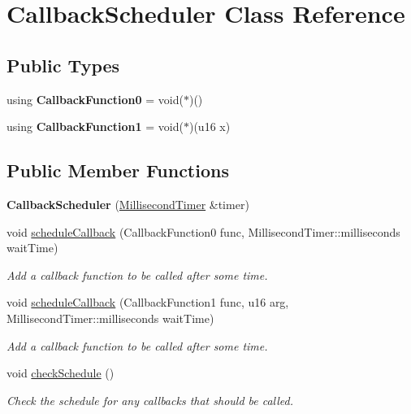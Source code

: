 \hypertarget{class_callback_scheduler}{}\section{Callback\+Scheduler Class Reference}
\label{class_callback_scheduler}
\subsection*{Public Types}
\begin{DoxyCompactItemize}
\item 
\mbox{\label{class_callback_scheduler_ad8c70bd2138c08c02f474beadb4c1eb0}} 
using {\bfseries Callback\+Function0} = void($\ast$)()
\item 
\mbox{\label{class_callback_scheduler_a5b5309cbabfda7ce8e7b1cedd087c010}} 
using {\bfseries Callback\+Function1} = void($\ast$)(u16 x)
\end{DoxyCompactItemize}
\subsection*{Public Member Functions}
\begin{DoxyCompactItemize}
\item 
\mbox{\label{class_callback_scheduler_ac790475d97e631ee0318f40c8de405f5}} 
{\bfseries Callback\+Scheduler} (\mbox{\hyperlink{class_millisecond_timer}{Millisecond\+Timer}} \&timer)
\item 
void \mbox{\hyperlink{class_callback_scheduler_a27a6883d1960c6fcd6082df62ddd7502}{schedule\+Callback}} (Callback\+Function0 func, Millisecond\+Timer\+::milliseconds wait\+Time)
\begin{DoxyCompactList}\small\item\em Add a callback function to be called after some time. \end{DoxyCompactList}\item 
void \mbox{\hyperlink{class_callback_scheduler_a15c17b465fad7e85e1f3ea858dd39f7a}{schedule\+Callback}} (Callback\+Function1 func, u16 arg, Millisecond\+Timer\+::milliseconds wait\+Time)
\begin{DoxyCompactList}\small\item\em Add a callback function to be called after some time. \end{DoxyCompactList}\item 
\mbox{\label{class_callback_scheduler_a7911c89e3706e4732f5ad8ed57a93fbc}} 
void \mbox{\hyperlink{class_callback_scheduler_a7911c89e3706e4732f5ad8ed57a93fbc}{check\+Schedule}} ()
\begin{DoxyCompactList}\small\item\em Check the schedule for any callbacks that should be called. \end{DoxyCompactList}\end{DoxyCompactItemize}


